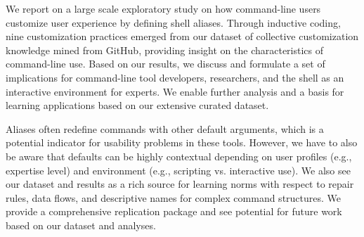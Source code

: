 \documentclass[smallextended,natbib]{svjour3}
\begin{document}
We report on a large scale exploratory study on how command-line users customize user experience by defining shell aliases.
Through inductive coding, nine customization practices emerged from our dataset of collective customization knowledge mined from GitHub, providing insight on the characteristics of command-line use.
Based on our results, we discuss and formulate a set of implications for command-line tool developers, researchers, and the shell as an interactive environment for experts.
We enable further analysis and a basis for learning applications based on our extensive curated dataset.

Aliases often redefine commands with other default arguments, which is a potential indicator for usability problems in these tools.
However, we have to also be aware that defaults can be highly contextual depending on user profiles (e.g., expertise level) and environment (e.g., scripting vs. interactive use).
We also see our dataset and results as a rich source for learning norms with respect to repair rules, data flows, and descriptive names for complex command structures.
We provide a comprehensive replication package and see potential for future work based on our dataset and analyses.



\end{document}
